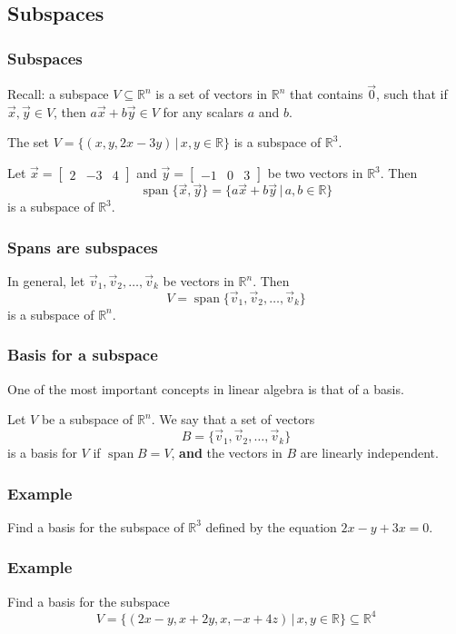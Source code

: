 \documentclass[11pt,t]{beamer}
\DeclareMathOperator{\spn}{span}
\newcommand{\R}{\mathbb{R}}
\begin{document}
\subsection{Subspaces}
\begin{frame}\frametitle{Subspaces}
 Recall: a \alert{subspace} $V\subseteq \R^n$ is a set of vectors in $\R^n$ that contains $\vec{0}$, such that if $\vec{x},\vec{y}\in V$, then $a\vec{x}+b\vec{y}\in V$ for any scalars $a$ and $b$.

\begin{example}
 The set $V=\{(x,y,2x-3y)\,|\, x,y\in\R\}$ is a subspace of $\R^3$.
\end{example}

\vspace{0.5in}

\begin{example}
 Let $\vec{x} = \begin{bmatrix}2&-3&4\end{bmatrix}$ and $\vec{y} = \begin{bmatrix}-1&0&3\end{bmatrix}$ be two vectors in $\R^3$. Then
\[
 \spn\{\vec{x},\vec{y}\} = \{a\vec{x}+b\vec{y}\,|\,a,b\in\R\}
\]
is a subspace of $\R^3$.
\end{example}

\end{frame}
\begin{frame}\frametitle{Spans are subspaces}
 In general, let $\vec{v}_1,\vec{v}_2,\ldots, \vec{v}_k$ be vectors in $\R^n$. Then
\[
 V = \spn\{\vec{v}_1,\vec{v}_2,\ldots, \vec{v}_k\}
\]
is a subspace of $\R^n$.
\end{frame}
\begin{frame}\frametitle{Basis for a subspace}
 One of the most important concepts in linear algebra is that of a \alert{basis}.
\begin{definition}
 Let $V$ be a subspace of $\R^n$. We say that a set of vectors 
\[
B=\{\vec{v}_1,\vec{v}_2,\ldots, \vec{v}_k \}
\]
is a \alert{basis} for $V$ if $\spn B = V$, {\bf and} the vectors in $B$ are linearly independent.
\end{definition}

\end{frame}
\begin{frame}\frametitle{Example}
 Find a basis for the subspace of $\R^3$ defined by the equation $2x-y+3x=0$.

\end{frame}
\begin{frame}\frametitle{Example}
 Find a basis for the subspace
\[
 V = \{(2x-y,x+2y,x,-x+4z)\,|\, x,y\in\R\}\subseteq \R^4
\]

\end{frame}
\end{document}
